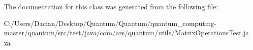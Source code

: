 The documentation for this class was generated from the following file\+:\begin{DoxyCompactItemize}
\item 
C\+:/\+Users/\+Dacian/\+Desktop/\+Quantum/\+Quantum/quantum\+\_\+computing-\/master/quantum/src/test/java/com/ars/quantum/utils/\hyperlink{_matrix_operations_test_8java}{Matrix\+Operations\+Test.\+java}\end{DoxyCompactItemize}
